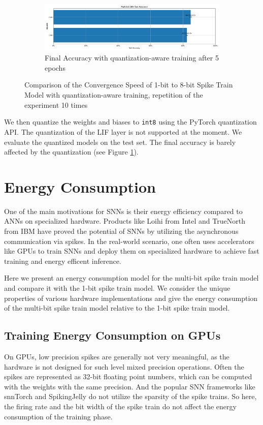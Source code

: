 \begin{figure}[!htpb]
\begin{subfigure}[H]{\textwidth}
            \centering
            \includegraphics[width=\textwidth]{../quantized/FashionMNIST/plots/fashionmnist_final_acc.pdf}
            \caption{Final Accuracy with quantization-aware training after 5 epochs}
            \label{fig:quantization_aware_final_acc}
        \end{subfigure}
        \caption{Comparison of the Convergence Speed of 1-bit to 8-bit Spike Train Model with quantization-aware training, repetition of the experiment 10 times}
        \label{fig:quantization_aware}
    \end{figure}

    We then quantize the weights and biases to \verb|int8| using the PyTorch quantization API. The quantization of the LIF layer is not supported at the moment. We evaluate the quantized models on the test set. The final accuracy is barely affected by the quantization (see Figure \ref{fig:quantization_aware_final_acc}). 

\section{Energy Consumption}
\label{sec:energy-consumption}
    One of the main motivations for SNNs is their energy efficiency compared to ANNs on specialized hardware. Products like Loihi from Intel \cite{8259423} and TrueNorth from IBM \cite{7229264} have proved the potential of SNNs by utilizing the asynchronous communication via spikes. In the real-world scenario, one often uses accelerators like GPUs to train SNNs and deploy them on specialized hardware to achieve fast training and energy efficent inference. 

    Here we present an energy consumption model for the multi-bit spike train model and compare it with the 1-bit spike train model. We consider the unique properties of various hardware implementations and give the energy consumption of the multi-bit spike train model relative to the 1-bit spike train model. 

    \subsection{Training Energy Consumption on GPUs}
    \label{subsec:training_energy}
        On GPUs, low precision spikes are generally not very meaningful, as the hardware is not designed for such level mixed precision operations. Often the spikes are represented as 32-bit floating point numbers, which can be computed with the weights with the same precision. And the popular SNN frameworks like snnTorch and SpikingJelly do not utilize the sparsity of the spike trains. So here, the firing rate and the bit width of the spike train do not affect the energy consumption of the training phase. 
    
